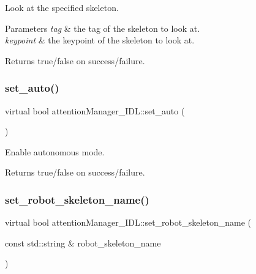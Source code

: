 Look at the specified skeleton. 


\begin{DoxyParams}{Parameters}
{\em tag} & the tag of the skeleton to look at. \\
\hline
{\em keypoint} & the keypoint of the skeleton to look at. \\
\hline
\end{DoxyParams}
\begin{DoxyReturn}{Returns}
true/false on success/failure. 
\end{DoxyReturn}
\mbox{\label{classattentionManager__IDL_a3c0c61fdb996d2b7378c02e6225a6c20}} 
\subsubsection{\texorpdfstring{set\_auto()}{set\_auto()}}
{\footnotesize\ttfamily virtual bool attention\+Manager\+\_\+\+I\+D\+L\+::set\+\_\+auto (\begin{DoxyParamCaption}{ }\end{DoxyParamCaption})\hspace{0.3cm}{\ttfamily [virtual]}}



Enable autonomous mode. 

\begin{DoxyReturn}{Returns}
true/false on success/failure. 
\end{DoxyReturn}
\mbox{\label{classattentionManager__IDL_ae50c946fce68f55cac50fe5136e1bc02}} 
\subsubsection{\texorpdfstring{set\_robot\_skeleton\_name()}{set\_robot\_skeleton\_name()}}
{\footnotesize\ttfamily virtual bool attention\+Manager\+\_\+\+I\+D\+L\+::set\+\_\+robot\+\_\+skeleton\+\_\+name (\begin{DoxyParamCaption}\item[{const std\+::string \&}]{robot\+\_\+skeleton\+\_\+name }\end{DoxyParamCaption})\hspace{0.3cm}{\ttfamily [virtual]}}



